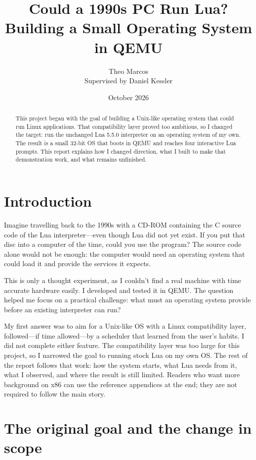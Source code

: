 \documentclass[11pt,a4paper]{scrartcl}
\title{\textbf{Could a 1990s PC Run Lua?}\\[0.4em]\large Building a Small Operating System in QEMU}
\author{Theo Marcos\\[0.4em]\large Supervised by Daniel Kessler}
\date{October 2026}
\begin{document}
\maketitle

\begin{abstract}
\noindent This project began with the goal of building a Unix-like operating
system that could run Linux applications. That compatibility layer proved
too ambitious, so I changed the target: run the unchanged Lua 5.5.0
interpreter on an operating system of my own. The result is a small 32-bit
OS that boots in QEMU and reaches four interactive Lua prompts. This report
explains how I changed direction, what I built to make that demonstration
work, and what remains unfinished.
\end{abstract}

\clearpage
\tableofcontents
\clearpage

\section{Introduction}

Imagine travelling back to the 1990s with a CD-ROM containing the C source
code of the Lua interpreter—even though Lua did not yet exist. If you put
that disc into a computer of the time, could you use the program? The source
code alone would not be enough: the computer would need an operating system
that could load it and provide the services it expects.

This is only a thought experiment, as I couldn't find a real machine with
time accurate hardware easily. I developed and tested it in QEMU. The
question helped me focus on a practical challenge: what must an operating
system provide before an existing interpreter can run?

My first answer was to aim for a Unix-like OS with a Linux compatibility
layer, followed—if time allowed—by a scheduler that learned from the user's
habits. I did not complete either feature. The compatibility layer was too
large for this project, so I narrowed the goal to running stock Lua on my
own OS. The rest of the report follows that work: how the system starts,
what Lua needs from it, what I observed, and where the result is still
limited. Readers who want more background on x86 can use the reference
appendices at the end; they are not required to follow the main story.

\section{The original goal and the change in scope}
\label{sec:goals}
\end{document}
